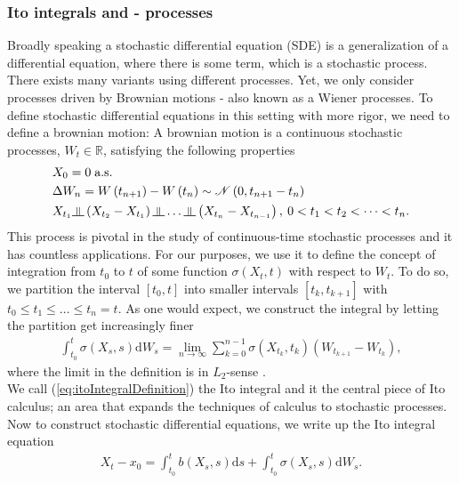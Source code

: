 \subsubsection{Ito integrals and - processes}
Broadly speaking a stochastic differential equation (SDE) is a generalization of a differential equation, where there is some term, which is a stochastic process. There exists many variants using different processes. Yet, we only consider processes driven by Brownian motions - also known as a Wiener processes. To define stochastic differential equations in this setting with more rigor, we need to define a brownian motion: A brownian motion is a continuous stochastic processes, $W_t\in\mathbb{R}$, satisfying the following properties
\begin{align}
    &X_0 = 0 \; \textrm{a.s.}\label{eq:brownianMotion1}\\
    &\Delta W_n = W\left(t_{n + 1}\right) - W\left(t_{n}\right)\sim\mathcal{N}\left(0, t_{n + 1} - t_{n}\right) \label{eq:brownianMotion2}\\
    &X_{t_1}\indep \left(X_{t_2} - X_{t_1}\right)\indep \dots \indep \left(X_{t_n} - X_{t_{n - 1}}\right), \: 0 < t_1 < t_2 < \dots < t_n. \label{eq:brownianMotion3}
\end{align}
This process is pivotal in the study of continuous-time stochastic processes and it has countless applications. For our purposes, we use it to define the concept of integration from $t_0$ to $t$ of some function $\sigma(X_t, t)$ with respect to $W_t$. To do so, we partition the interval $[t_0, t]$ into smaller intervals $[t_k, t_{k + 1}]$ with $t_0 \leq t_1 \leq \dots \leq t_n = t$. As one would expect, we construct the integral by letting the partition get increasingly finer
\begin{align}
    \int_{t_0}^t \sigma(X_s, s) \mathrm{d}W_s = \lim_{n \to \infty}\sum_{k = 0}^{n - 1} \sigma\left(X_{t_k}, t_k\right)\left(W_{t_{k + 1}} - W_{t_k}\right),\label{eq:itoIntegralDefinition}
\end{align}
where the limit in the definition is in $L_2$-sense \cite[equation 4.6]{Srkk2019}. \\
We call (\ref{eq:itoIntegralDefinition}) the Ito integral and it the central piece of Ito calculus; an area that expands the techniques of calculus to stochastic processes. Now to construct stochastic differential equations, we write up the Ito integral equation
\begin{align}
    X_t - x_0 = \int_{t_0}^t b(X_s, s)\mathrm{d}s + \int_{t_0}^t \sigma(X_s, s)\mathrm{d}W_s. \label{eq:itoIntegralEquation}
\end{align}

